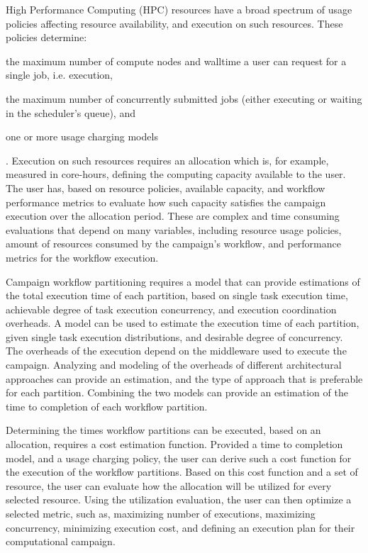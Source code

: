 High Performance Computing (HPC) resources have a broad spectrum of usage 
policies affecting resource availability, and execution on such resources. These 
policies determine:
\begin{inparaenum}[1)]
\item the maximum number of compute nodes and walltime a user can request for a 
single job, i.e. execution,
\item the maximum number of concurrently submitted jobs (either executing or 
waiting in the scheduler's queue), and
\item one or more usage charging models 
\end{inparaenum}. Execution on such resources requires an allocation which is, 
for example, measured in core-hours, defining the computing capacity available 
to the user. The user has, based on resource policies, available capacity, and 
workflow performance metrics to evaluate how such capacity satisfies the 
campaign execution over the allocation period. These are complex and time 
consuming evaluations that depend on many variables, including resource usage 
policies, amount of resources consumed by the campaign’s workflow, and 
performance metrics for the workflow execution.
 
Campaign workflow partitioning requires a model that can provide estimations 
of the total execution time of each partition, based on single task execution 
time, achievable degree of task execution concurrency, and execution 
coordination overheads. A model can be used to estimate the execution time of 
each partition, given single task execution distributions, and desirable 
degree of concurrency. The overheads of the execution depend on the middleware 
used to execute the campaign. Analyzing and modeling of the overheads of 
different architectural approaches can provide an estimation, and the type of 
approach that is preferable for each partition. Combining the two models can 
provide an estimation of the time to completion of each workflow partition. 
 
Determining the times workflow partitions can be executed, based on an 
allocation, requires a cost estimation function. Provided a time to completion 
model, and a usage charging policy, the user can derive such a cost function 
for the execution of the workflow partitions. Based on this cost function and a 
set of resource, the user can evaluate how the allocation will be utilized for 
every selected resource. Using the utilization evaluation, the user can then 
optimize a selected metric, such as, maximizing number of executions, 
maximizing concurrency, minimizing execution cost, and defining an execution 
plan for their computational campaign.
 
